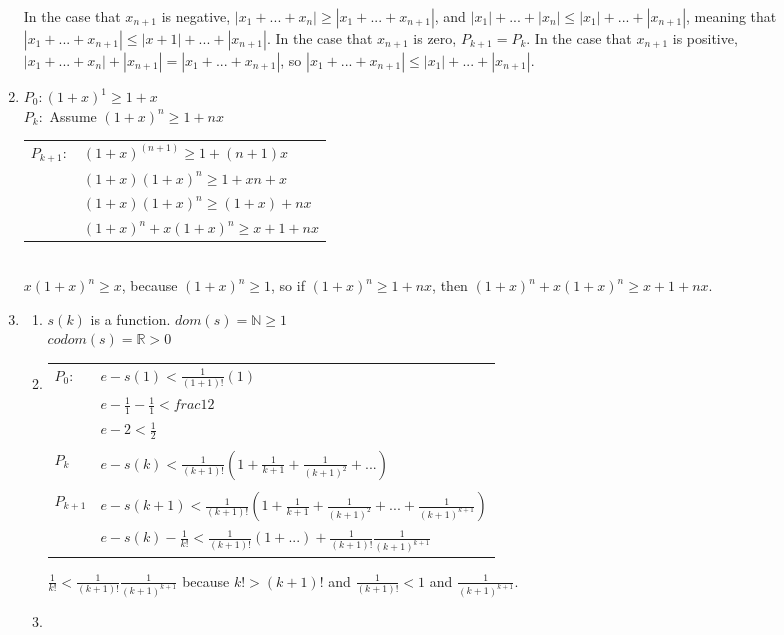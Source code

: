 \documentclass{article}
\begin{document}
\begin{enumerate}
			In the case that $x_{n+1}$ is negative, $|x_1 + ... + x_n| \geq |x_1 + ... + x_{n+1}|$, and $|x_1| + ... + |x_n| \leq |x_1| + ... + |x_{n+1}|$, meaning that $|x_1 + ... + x_{n+1}| \leq |x+1| + ... + |x_{n+1}|$. In the case that $x_{n+1}$ is zero, $P_{k+1} = P_{k}$. In the case that $x_{n+1}$ is positive, $|x_1 + ... + x_n| + |x_{n+1}| = |x_1 + ... + x_{n+1}|$, so $|x_1 + ... + x_{n+1}| \leq |x_1| + ... + |x_{n+1}|$.
		\item
			$P_0: (1+x)^1 \geq 1+x$\\
			$P_k:$ Assume $(1+x)^n \geq 1+nx$\\
			\begin{tabular}{l l}
				$P_{k+1}:$ & $ (1+x)^(n+1) \geq 1 + (n+1)x$\\
				& $(1+x)(1+x)^n \geq 1 + xn + x$\\
				& $(1+x)(1+x)^n \geq (1+x) + nx$\\
				& $(1+x)^n + x(1+x)^n \geq x + 1 + nx$\\
			\end{tabular}\\
			$x(1+x)^n \geq x$, because $(1+x)^n \geq 1$, so if $(1+x)^n \geq 1+nx$, then $(1+x)^n + x(1+x)^n \geq x + 1 + nx$.\\
		\item
			\begin{enumerate}
				\item
					$s(k)$ is a function.
					$dom(s) = \mathbb{N} \geq 1$\\
					$codom(s) = \mathbb{R} > 0$\\
				\item
					\begin{tabular}{l l}
						$P_0:$ & $ e - s(1) < \frac{1}{(1+1)!}(1)$\\
						& $e - \frac{1}{1} - \frac{1}{1} < frac{1}{2}$\\
						& $e - 2 < \frac{1}{2}$\\
						\\
						$P_k$ & $ e - s(k) < \frac{1}{(k+1)!}(1+\frac{1}{k+1} + \frac{1}{(k+1)^2} + ...)$\\\\
						$P_{k+1}$ & $ e - s(k+1) < \frac{1}{(k+1)!} (1+\frac{1}{k+1}+\frac{1}{(k+1)^2} + ... + \frac{1}{(k+1)^{k+1}})$\\
						& $ e - s(k) - \frac{1}{k!} < \frac{1}{(k+1)!}(1+...) + \frac{1}{(k+1)!} \frac{1}{(k+1)^{k+1}}$\\
					\end{tabular}
					$\frac{1}{k!} < \frac{1}{(k+1)!} \frac{1}{(k+1)^{k+1}}$ because $k! > (k+1)!$ and $\frac{1}{(k+1)!} < 1$ and $\frac{1}{(k+1)^{k+1}}$.\\
				\item
			\end{enumerate}

	\end{enumerate}
\end{document}
